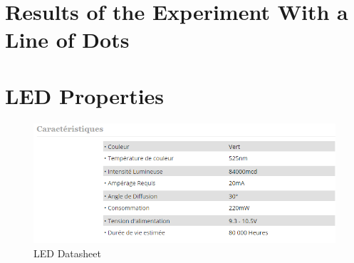 \documentclass[12pt,a4paper,fleqn, onesside]{report}
\begin{document}




\appendix
{}
\section{Results of the Experiment With a Line of Dots}
\label{resultsApp}


\newpage
\section{LED Properties}
\label{LEDdatasheet}
\begin{figure}[h]
  \centerline{\includegraphics[scale=0.8]{fig/LedDataSheet.png}}
  \caption{LED Datasheet}
  \label{fig:LEDdatasheet}
\end{figure}

\newpage
\end{document}
